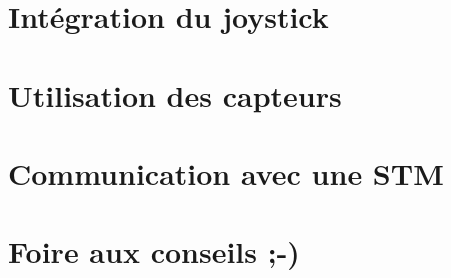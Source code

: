 \documentclass[a4paper,10pt]{article}
\begin{document}

\section{Intégration du joystick}


\section{Utilisation des capteurs}


\section{Communication avec une STM}


\section{Foire aux conseils ;-)}
\end{document}
